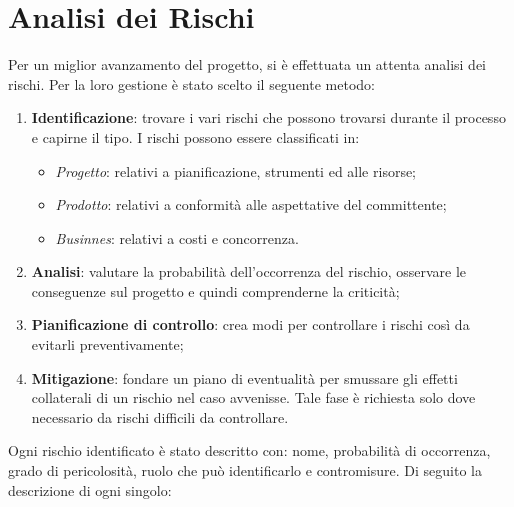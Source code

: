 \documentclass[12pt,a4paper,titlepage]{article}
\begin{document}
\section{Analisi dei Rischi}
Per un miglior avanzamento del progetto, si è effettuata un attenta analisi dei rischi. Per la loro gestione è stato scelto il seguente metodo: 
\begin{enumerate}
	\item \textbf{Identificazione}: trovare i vari rischi che possono trovarsi durante il processo e capirne il tipo. I rischi possono essere classificati in:
	\begin{itemize}
		\item \textit{Progetto}: relativi a pianificazione, strumenti ed alle risorse;
		\item \textit{Prodotto}: relativi a conformità alle aspettative del committente;
		\item \textit{Businnes}: relativi a costi e concorrenza.
	\end{itemize}
	\item \textbf{Analisi}: valutare la probabilità dell'occorrenza del rischio, osservare le conseguenze sul progetto e quindi comprenderne la criticità;
	\item \textbf{Pianificazione di controllo}: crea modi per controllare i rischi così da evitarli preventivamente;
	\item \textbf{Mitigazione}: fondare un piano di eventualità per smussare gli effetti collaterali di un rischio nel caso avvenisse. Tale fase è richiesta solo dove necessario da rischi difficili da controllare.
\end{enumerate}
Ogni rischio identificato è stato descritto con: nome, probabilità di occorrenza, grado di pericolosità, ruolo che può identificarlo e contromisure. Di seguito la descrizione di ogni singolo:\\
\end{document}
